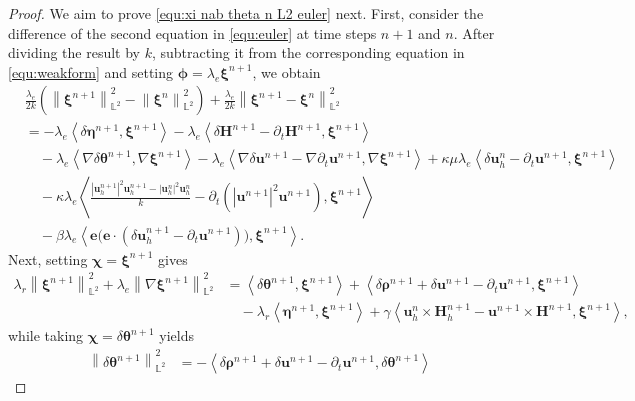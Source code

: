 \documentclass[11pt, reqno]{amsart}
\theoremstyle{definition}
\theoremstyle{remark}
\numberwithin{equation}{section}
\newcommand{\bff}{\boldsymbol}
\newcommand{\bb}{\mathbb}
\newcommand{\norm}[2]{\left\|{#1}\right\|_{#2}}
\newcommand{\inpro}[2]{\left\langle#1,#2\right\rangle}
\newcommand{\abs}[1]{\left|{#1}\right|}
\begin{document}
\begin{proof}
	We aim to prove \eqref{equ:xi nab theta n L2 euler} next. First, consider the difference of the second equation in \eqref{equ:euler} at time steps $n+1$ and $n$. After dividing the result by $k$, subtracting it from the corresponding equation in \eqref{equ:weakform} and setting $\bff{\phi}=\lambda_e \bff{\xi}^{n+1}$, we obtain
	\begin{align}\label{equ:dt xi n euler}
		\nonumber
		&\frac{\lambda_e}{2k} \left(\norm{\bff{\xi}^{n+1}}{\bb{L}^2}^2-\norm{\bff{\xi}^n}{\bb{L}^2}^2\right)
		+
		\frac{\lambda_e}{2k} \norm{\bff{\xi}^{n+1}-\bff{\xi}^n}{\bb{L}^2}^2
		\\
		\nonumber
		&=
		-\lambda_e \inpro{\delta \bff{\eta}^{n+1}}{\bff{\xi}^{n+1}}
		-
		\lambda_e \inpro{\delta\bff{H}^{n+1}-\partial_t \bff{H}^{n+1}}{\bff{\xi}^{n+1}}
		\\
		\nonumber
		&\quad
		-\lambda_e \inpro{\nabla \delta \bff{\theta}^{n+1}}{\nabla \bff{\xi}^{n+1}}
		-
		\lambda_e \inpro{\nabla \delta \bff{u}^{n+1}-\nabla \partial_t \bff{u}^{n+1}}{\nabla \bff{\xi}^{n+1}}
		+
		\kappa \mu \lambda_e \inpro{\delta \bff{u}_h^n -\partial_t \bff{u}^{n+1}}{\bff{\xi}^{n+1}}
		\\
		&\quad
		-
		\kappa \lambda_e
		\inpro{\frac{\abs{\bff{u}_h^{n+1}}^2 \bff{u}_h^{n+1} - \abs{\bff{u}_h^n}^2 \bff{u}_h^n}{k} - \partial_t \left(\abs{\bff{u}^{n+1}}^2 \bff{u}^{n+1}\right)}{\bff{\xi}^{n+1}}
		\nonumber \\
		&\quad
		-
		\beta\lambda_e \inpro{\bff{e}\big(\bff{e}\cdot (\delta \bff{u}_h^{n+1}-\partial_t \bff{u}^{n+1})\big)}{\bff{\xi}^{n+1}}.
	\end{align}
	Next, setting $\bff{\chi}=\bff{\xi}^{n+1}$ gives
	\begin{align}\label{equ:xi nab xi euler}
		\nonumber
		\lambda_r \norm{\bff{\xi}^{n+1}}{\bb{L}^2}^2
		+
		\lambda_e \norm{\nabla \bff{\xi}^{n+1}}{\bb{L}^2}^2
		&=
		\inpro{\delta \bff{\theta}^{n+1}}{\bff{\xi}^{n+1}}
		+
		\inpro{\delta \bff{\rho}^{n+1}+\delta \bff{u}^{n+1}-\partial_t \bff{u}^{n+1}}{\bff{\xi}^{n+1}}
		\\
		&\quad
		-
		\lambda_r \inpro{\bff{\eta}^{n+1}}{\bff{\xi}^{n+1}}
		+
		\gamma \inpro{\bff{u}_h^n\times \bff{H}_h^{n+1}- \bff{u}^{n+1}\times \bff{H}^{n+1}}{\bff{\xi}^{n+1}},
	\end{align}
	while taking $\bff{\chi}=\delta \bff{\theta}^{n+1}$ yields
	\begin{align}\label{equ:d theta n euler}
		\nonumber
		\norm{\delta \bff{\theta}^{n+1}}{\bb{L}^2}^2
		&=
		-
		\inpro{\delta \bff{\rho}^{n+1}+\delta \bff{u}^{n+1}-\partial_t \bff{u}^{n+1}}{\delta \bff{\theta}^{n+1}}

\end{align}
\end{proof}
\end{document}
